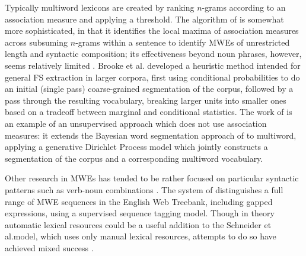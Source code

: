 \documentclass[11pt,letterpaper]{article}
\makeatletter
\def \al {al.\@ }
\makeatother
\begin{document}
Typically multiword lexicons are created by ranking $n$-grams according to an association measure and applying a threshold. The algorithm of  is somewhat more sophisticated, in that it identifies the local maxima of association measures across subsuming $n$-grams within a sentence to identify MWEs of unrestricted length and syntactic composition; its effectiveness beyond noun phrases, however, seems relatively limited \cite{Ramisch12}. Brooke et \al {} developed a heuristic method intended for general FS extraction in larger corpora, first using conditional probabilities to do an initial (single pass) coarse-grained segmentation of the corpus, followed by a pass through the resulting vocabulary, breaking larger units into smaller ones based on a tradeoff between marginal and conditional statistics. The work of  is an example of an unsupervised approach which does not use association measures: it extends the Bayesian word segmentation approach of  to multiword, applying a generative Dirichlet Process model which jointly constructs a segmentation of the corpus and a corresponding multiword vocabulary.

Other research in MWEs has tended to be rather focused on particular syntactic patterns such as verb-noun combinations \cite{Fazly09}. The system of  distinguishes a full range of MWE sequences in the English Web Treebank, including gapped expressions, using a supervised sequence tagging model. Though in theory automatic lexical resources could be a useful addition to the Schneider et \al model, which uses only manual lexical resources, attempts to do so have achieved mixed success \cite{Riedl16}. 
\end{document}
